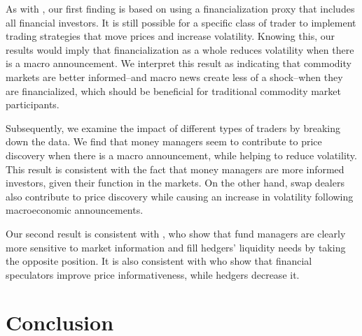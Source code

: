 \documentclass[12pt]{article}
\begin{document}
As with \citet{brunetti2009speculation}, our first finding is based on using a financialization proxy that includes all financial investors. It is still possible for a specific class of trader to implement trading strategies that move prices and increase volatility. Knowing this, our results would imply that financialization as a whole reduces volatility when there is a macro announcement. We interpret this result as indicating that commodity markets are better informed--and macro news create less of a shock--when they are financialized, which should be beneficial for traditional commodity market participants. 

Subsequently, we examine the impact of different types of traders by breaking down the data. We find that money managers seem to contribute to price discovery when there is a macro announcement, while helping to reduce volatility. This result is consistent with the fact that money managers are more informed investors, given their function in the markets. On the other hand, swap dealers also contribute to price discovery while causing an increase in volatility following macroeconomic announcements. 

Our second result is consistent with \citet{cheng2012convective}, who show that fund managers are clearly more sensitive to market information and fill hedgers’ liquidity needs by taking the opposite position. It is also consistent with  \citet{goldstein2014speculation} who show that financial speculators improve price informativeness, while hedgers decrease it. 




\section{Conclusion} \label{sec:conclusion}
\end{document}
